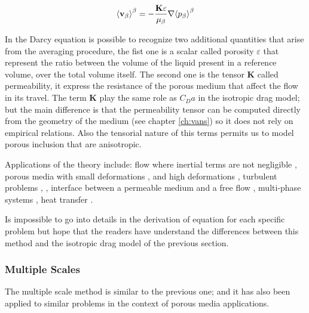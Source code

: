 \begin{equation}
{\left< \textbf{v}_{\beta} \right>}^{\beta} = -\dfrac{\mathbf{K} \varepsilon}{\mu_{\beta}} \nabla {\left< p_{\beta} \right>}^{\beta}
\label{eq:darcyeq}
\end{equation} 

In the Darcy equation is possible to recognize two additional quantities that arise from the averaging procedure, the fist one is a scalar called porosity $\varepsilon$ that represent the ratio between the volume of the liquid present in a reference volume, over the total volume itself.
The second one is the tensor $\mathbf{K}$ called permeability, it express the resistance of the porous medium that affect the flow in its travel.
The term $\mathbf{K}$ play the same role as $C_D a$ in the isotropic drag model; but the main difference is that the permeability tensor can be computed directly from the geometry of the medium (see chapter \ref{ch:vans}) so it does not rely on empirical relations.
Also the tensorial nature of this terms permits us to model porous inclusion that are anisotropic.

Applications of the theory include: flow where inertial terms are not negligible \citet{whitaker1996forchheimer}, porous media with small deformations \citet{whitaker1986flow2}, and high deformations \citet{hussong2011continuum}, turbulent problems \citet{soulaine2014}, \citet{breugem2006influence}, interface between a permeable medium and a free flow \citet{beavers1967boundary}, multi-phase systems \citet{whitaker1973transport}, heat transfer \citet{carbonell1984heat}.

Is impossible to go into details in the derivation of equation for each specific problem but hope that the readers have understand the differences between this method and the isotropic drag model of the previous section.

\subsubsection{Multiple Scales}

The multiple scale method is similar to the previous one; and it has also been applied to similar problems in the context of porous media applications.

